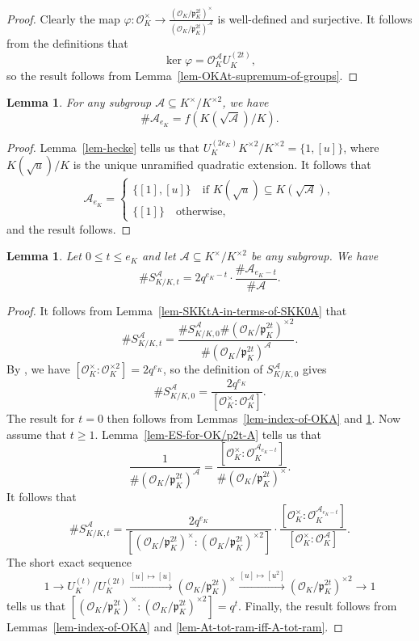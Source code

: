 \documentclass[11pt]{amsart}
\theoremstyle{theorem}
\newtheorem{lemma}[theorem]{Lemma}
\theoremstyle{example}
\theoremstyle{definition}
\numberwithin{theorem}{section}
\numberwithin{theorem}{section}
\newcommand{\co}{\mathcal{O}}
\newcommand{\p}{\mathfrak{p}}
\begin{document}
\begin{proof}
    Clearly the map $\varphi:\co_K^\times \to \frac{(\co_K/\p_K^{2t})^\times}{(\co_K/\p_K^{2t})^\mathcal{A}}$ is well-defined and surjective. It follows from the definitions that 
    $$
    \ker \varphi = \co_K^\mathcal{A} U_K^{(2t)},
    $$
    so the result follows from Lemma~\ref{lem-OKAt-supremum-of-groups}.
\end{proof}
\begin{lemma}
    \label{lem-size-of-A_eK}
    For any subgroup $\mathcal{A}\subseteq K^\times / K^{\times 2}$, we have 
    $$
    \# \mathcal{A}_{e_K} = f(K(\sqrt{\mathcal{A}})/K). 
    $$
\end{lemma}
\begin{proof}
    Lemma~\ref{lem-hecke} tells us that $U_K^{(2e_K)}K^{\times 2}/K^{\times 2} = \{1, [u]\}$, where $K(\sqrt{u})/K$ is the unique unramified quadratic extension. It follows that 
    $$
    \mathcal{A}_{e_K} = \begin{cases}
        \{[1],[u]\}\quad\text{if $K(\sqrt{u})\subseteq K(\sqrt{\mathcal{A}})$},
        \\
        \{[1]\}\quad\text{otherwise},
    \end{cases}
    $$
    and the result follows. 
\end{proof}
\begin{lemma}
    \label{lem-size-of-SKKtA}
    Let $0 \leq t \leq e_K$ and let $\mathcal{A}\subseteq K^\times / K^{\times 2}$ be any subgroup. We have
    $$
    \#S_{K/K,t}^\mathcal{A} = 2q^{e_K - t} \cdot \frac{\#\mathcal{A}_{e_K-t}}{\#\mathcal{A}}. 
    $$
\end{lemma}
\begin{proof}
    It follows from Lemma~\ref{lem-SKKtA-in-terms-of-SKK0A} that 
    $$
    \#S_{K/K,t}^\mathcal{A} = \frac{\# S_{K/K,0}^\mathcal{A} \#(\co_K/\p_K^{2t})^{\times 2}}{\#(\co_K/\p_K^{2t})^\mathcal{A}}. 
    $$
    By \cite[Proposition 3.7]{neukirch-bonn}, we have $[\co_K^\times : \co_K^{\times 2}] = 2q^{e_K}$, so the definition of $S_{K/K,0}^\mathcal{A}$ gives
    $$
    \# S_{K/K,0}^\mathcal{A} = \frac{2q^{e_K}}{[\co_K^\times : \co_K^\mathcal{A}]}.
    $$
    The result for $t=0$ then follows from Lemmas~\ref{lem-index-of-OKA} and \ref{lem-size-of-A_eK}. Now assume that $t \geq 1$. 
    Lemma~\ref{lem-ES-for-OK/p2t-A} tells us that 
    $$
    \frac{1}{\# (\co_K/\p_K^{2t})^\mathcal{A}} = \frac{[\co_K^\times : \co_K^{\mathcal{A}_{e_K-t}}]}{\#(\co_K/\p_K^{2t})^\times}.
    $$
    It follows that 
    $$
    \#S_{K/K,t}^\mathcal{A} = \frac{2q^{e_K}}{[(\co_K/\p_K^{2t})^\times : (\co_K/\p_K^{2t})^{\times 2}]}\cdot \frac{[\co_K^\times : \co_K^{\mathcal{A}_{e_K-t}}]}{[\co_K^\times : \co_K^{\mathcal{A}}]}.
    $$
    The short exact sequence 
    $$
    1 \to U_K^{(t)}/U_K^{(2t)} \overset{[u]\mapsto [u]}{\to} (\co_K/\p_K^{2t})^\times \overset{[u] \mapsto [u^2]}{\to} (\co_K/\p_K^{2t})^{\times 2} \to 1
    $$
    tells us that $[(\co_K/\p_K^{2t})^\times : (\co_K/\p_K^{2t})^{\times 2}] = q^t$. Finally, the result follows from Lemmas~\ref{lem-index-of-OKA} and \ref{lem-At-tot-ram-iff-A-tot-ram}.
\end{proof}
\end{document}
